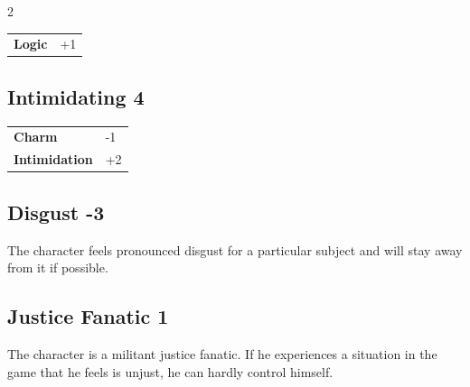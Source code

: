 \begin{multicols}{2}
\begin{tcolorbox}
\begin{tabular}{@{}ll@{}}
    \textbf{Logic} & +1\\
\end{tabular}


\end{tcolorbox}

\begin{tcolorbox}
    \subsection*{Intimidating \hfill \small{4 }}
    \tcblower




\begin{tabular}{@{}ll@{}}
    \textbf{Charm} & -1\\
    \textbf{Intimidation} & +2\\
\end{tabular}


\end{tcolorbox}

\begin{tcolorbox}
    \subsection*{Disgust \hfill \small{-3 }}
    \tcblower
The character feels pronounced disgust for a particular subject and will stay away from it if possible.


\vspace{3mm}



\end{tcolorbox}

\begin{tcolorbox}
    \subsection*{Justice Fanatic \hfill \small{1 }}
    \tcblower
The character is a militant justice fanatic. If he experiences a situation in the game that he feels is unjust, he can hardly control himself.



\end{tcolorbox}
\end{multicols}
